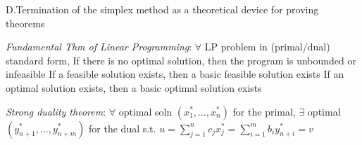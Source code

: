 
\item{D.}Termination of the simplex method as a theoretical device for proving
theorems\smallskip

\emph{Fundamental Thm of Linear Programming}: $\forall$ LP problem
in (primal/dual) standard form,\smallskip
{}If there is no optimal solution, then the program is unbounded or
infeasible\smallskip
{}If a feasible solution exists, then a basic feasible solution exists
\smallskip
{}If an optimal solution exists, then a basic optimal solution exists
\smallskip

\emph{Strong duality theorem}: $\forall$ optimal soln $(x_1^*,\ldots,
x_n^*)$ for the primal, $\exists$ optimal $(y_{n+1}^*,\ldots,y_{n+m}^*)$ for the
dual s.t. $u=\sum_{j=1}^nc_jx_j^*=\sum_{i=1}^mb_iy_{n+i}^*=v$\smallskip

\vfill\eject
